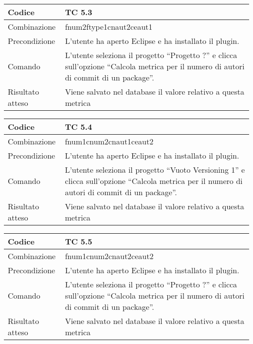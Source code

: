 \begin{table}[ht]
\begin{tabular}{|p{3cm}|p{9cm}|}
\hline
\cellcolor{lightgray}Codice				& TC 5.3								\\
\hline
\cellcolor{lightgray}Combinazione		& fnum2ftype1cnaut2ceaut1								\\
\hline
\cellcolor{lightgray}Precondizione		& L'utente ha aperto Eclipse e ha installato il plugin.					\\
\hline
\cellcolor{lightgray}Comando			& L'utente seleziona il progetto ``Progetto ?''  e clicca sull'opzione ``Calcola metrica per il numero di autori di commit di un package''.	\\
\hline
\cellcolor{lightgray}Risultato atteso	& Viene salvato nel database il valore relativo a questa metrica	\\
\hline
\end{tabular}
\end{table}

\begin{table}[ht]
\begin{tabular}{|p{3cm}|p{9cm}|}
\hline
\cellcolor{lightgray}Codice				& TC 5.4								\\
\hline
\cellcolor{lightgray}Combinazione		& fnum1cnum2cnaut1ceaut2							\\
\hline
\cellcolor{lightgray}Precondizione		& L'utente ha aperto Eclipse e ha installato il plugin.			\\
\hline
\cellcolor{lightgray}Comando			& L'utente seleziona il progetto ``Vuoto Versioning 1''  e clicca sull'opzione ``Calcola metrica per il numero di autori di commit di un package''.	\\
\hline
\cellcolor{lightgray}Risultato atteso	& Viene salvato nel database il valore relativo a questa metrica	\\
\hline
\end{tabular}
\end{table}

\begin{table}[ht]
\begin{tabular}{|p{3cm}|p{9cm}|}
\hline
\cellcolor{lightgray}Codice				& TC 5.5								\\
\hline
\cellcolor{lightgray}Combinazione		& fnum1cnum2cnaut2ceaut2 									\\
\hline
\cellcolor{lightgray}Precondizione		& L'utente ha aperto Eclipse e ha installato il plugin.			\\
\hline
\cellcolor{lightgray}Comando			& L'utente seleziona il progetto ``Progetto ?''  e clicca sull'opzione ``Calcola metrica per il numero di autori di commit di un package''.	\\
\hline
\cellcolor{lightgray}Risultato atteso	& Viene salvato nel database il valore relativo a questa metrica	\\
\hline
\end{tabular}
\end{table}

